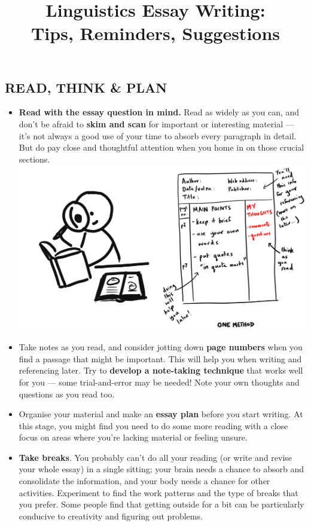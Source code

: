\documentclass[10pt,a4paper]{article}
\begin{document}
\title{\LARGE\sffamily\bfseries Linguistics Essay Writing:\\Tips, Reminders, Suggestions}
\date{}

\maketitle

\begin{multicols}{2}

\section*{READ, THINK \& PLAN}

\begin{itemize}
\item \textbf{Read with the essay question in mind.} Read as widely as you can, and don’t be afraid to \textbf{skim and scan} for important or interesting material --- it’s not always a good use of your time to absorb every paragraph in detail. But do pay close and thoughtful attention when you home in on those crucial sections.
  \includegraphics[width=0.9\columnwidth]{cartoons/read-take-notes.png}
\item Take notes as you read, and consider jotting down \textbf{page numbers} when you find a passage that might be important. This will help you when writing and referencing later. Try to \textbf{develop a note-taking technique} that works well for you --- some trial-and-error may be needed! Note your own thoughts and questions as you read too.
\item Organise your material and make an \textbf{essay plan} before you start writing. At this stage, you might find you need to do some more reading with a close focus on areas where you’re lacking material or feeling unsure.
\item \textbf{Take breaks}. You probably can’t do all your reading (or write and revise your whole essay) in a single sitting; your brain needs a chance to absorb and consolidate the information, and your body needs a chance for other activities. Experiment to find the work patterns and the type of breaks that you prefer. Some people find that getting outside for a bit can be particularly conducive to creativity and figuring out problems.
\end{itemize}


\end{multicols}
\end{document}
